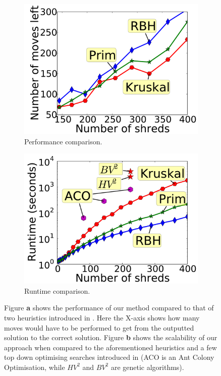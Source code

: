 \documentclass{llncs}
\begin{document}
\begin{figure}[h]
    \centering
    \begin{subfigure}[b]{0.48\textwidth}
        \centering
        \includegraphics[width=\textwidth]{searchComp.pdf}
        \caption{Performance comparison.}
    \end{subfigure}
    \begin{subfigure}[b]{0.48\textwidth}
        \centering
        \includegraphics[width=\textwidth]{searchTimeComp.pdf}
        \caption{Runtime comparison.}
    \end{subfigure}
     \caption{Figure {\bf a} shows the performance of our method compared to that of two heuristics introduced in \cite{P3}. Here the X-axis shows how many moves would have to be performed to get from the outputted solution to the correct solution. Figure {\bf b} shows the scalability of our approach when compared to the aforementioned heuristics and a few top down optimising searches introduced in \cite{P4} (ACO is an Ant Colony Optimisation, while $HV^2$ and $BV^2$ are genetic algorithms).}
    \label{fig:searchScal}
\end{figure}
\end{document}
